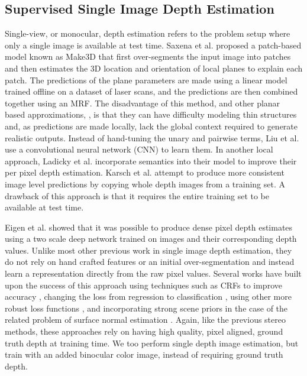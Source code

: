 \documentclass[10pt,twocolumn,letterpaper]{article}
\makeatletter
\newcommand*{\ea}{et al.\@\xspace}
\makeatother
\begin{document}
\subsection*{Supervised Single Image Depth Estimation}
Single-view, or monocular, depth estimation refers to the problem setup where only a single image is available at test time. 
Saxena \ea\cite{saxena2009make3d} proposed a patch-based model known as Make3D that first over-segments the input image into patches and then estimates the 3D location and orientation of local planes to explain each patch.
The predictions of the plane parameters are made using a linear model trained offline on a dataset of laser scans, and the predictions are then combined together using an MRF. 
The disadvantage of this method, and other planar based approximations, \eg \cite{hoiem2005automatic}, is that they can have difficulty modeling thin structures and, as predictions are made locally, lack the global context required to generate realistic outputs.
Instead of hand-tuning the unary and pairwise terms, Liu \ea\cite{liu2015learning} use a  convolutional neural network (CNN) to learn them. 
In another local approach, Ladicky \ea\cite{ladicky2014pulling} incorporate semantics into their model to improve their per pixel depth estimation.
Karsch \ea\cite{karsch2014depth} attempt to produce more consistent image level predictions by copying whole depth images from a training set.
A drawback of this approach is that it requires the entire training set to be available at test time. 

Eigen \ea\cite{eigen2014depth, eigen2015predicting} showed that it was possible to produce dense pixel depth estimates using a two scale deep network trained on images and their corresponding depth values.
Unlike most other previous work in single image depth estimation, they do not rely on hand crafted features or an initial over-segmentation and instead learn a representation directly from the raw pixel values. 
Several works have built upon the success of this approach using techniques such as CRFs to improve accuracy \cite{li2015depth}, changing the loss from regression to classification \cite{cao2016estimating}, using other more robust loss functions \cite{laina2016deeper}, and incorporating strong scene priors in the case of the related problem of surface normal estimation \cite{wang2015designing}. 
Again, like the previous stereo methods, these approaches rely on having high quality, pixel aligned, ground truth depth at training time. 
We too perform single depth image estimation, but train with an added binocular color image, instead of requiring ground truth depth.
\end{document}
